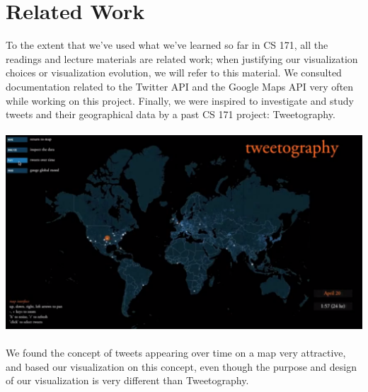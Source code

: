 \documentclass[pdftex,12pt,a4paper]{article}
\begin{document}
\section{Related Work}
To the extent that we've used what we've learned so far in CS 171, all the readings and lecture materials are related work; when justifying our visualization choices or visualization evolution, we will refer to this material. We consulted documentation related to the Twitter API and the Google Maps API very often while working on this project. Finally, we were inspired to investigate and study tweets and their geographical data by a past CS 171 project: Tweetography. \\ \\
\includegraphics[width=5.5in]{tweetography.png} \\ \\
We found the concept of tweets appearing over time on a map very attractive, and based our visualization on this concept, even though the purpose and design of our visualization is very different than Tweetography.
\end{document}
